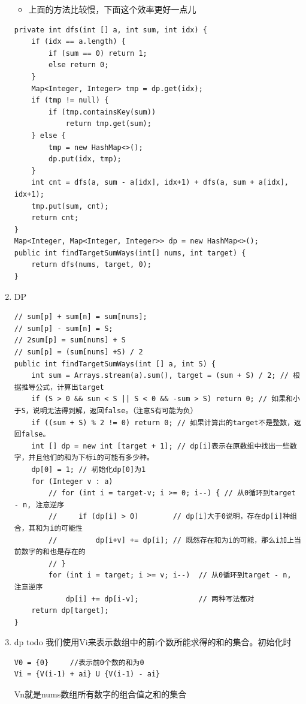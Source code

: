 \documentclass[9pt, b5paaper]{book}
\begin{document}
\begin{enumerate}
\begin{itemize}
\item 上面的方法比较慢，下面这个效率更好一点儿
\end{itemize}
\begin{verbatim}
private int dfs(int [] a, int sum, int idx) {
    if (idx == a.length) {
        if (sum == 0) return 1;
        else return 0;
    }
    Map<Integer, Integer> tmp = dp.get(idx);
    if (tmp != null) {
        if (tmp.containsKey(sum))
            return tmp.get(sum);
    } else {
        tmp = new HashMap<>();
        dp.put(idx, tmp);
    }
    int cnt = dfs(a, sum - a[idx], idx+1) + dfs(a, sum + a[idx], idx+1);
    tmp.put(sum, cnt);
    return cnt;
}
Map<Integer, Map<Integer, Integer>> dp = new HashMap<>();
public int findTargetSumWays(int[] nums, int target) {
    return dfs(nums, target, 0);
}
\end{verbatim}
\item DP
\label{sec-1-1-6-3}
\begin{verbatim}
// sum[p] + sum[n] = sum[nums];
// sum[p] - sum[n] = S;
// 2sum[p] = sum[nums] + S
// sum[p] = (sum[nums] +S) / 2
public int findTargetSumWays(int [] a, int S) {
    int sum = Arrays.stream(a).sum(), target = (sum + S) / 2; // 根据推导公式，计算出target
    if (S > 0 && sum < S || S < 0 && -sum > S) return 0; // 如果和小于S，说明无法得到解，返回false。（注意S有可能为负）
    if ((sum + S) % 2 != 0) return 0; // 如果计算出的target不是整数，返回false。
    int [] dp = new int [target + 1]; // dp[i]表示在原数组中找出一些数字，并且他们的和为下标i的可能有多少种。
    dp[0] = 1; // 初始化dp[0]为1
    for (Integer v : a) 
        // for (int i = target-v; i >= 0; i--) { // 从0循环到target - n, 注意逆序
        //     if (dp[i] > 0)        // dp[i]大于0说明，存在dp[i]种组合，其和为i的可能性
        //         dp[i+v] += dp[i]; // 既然存在和为i的可能，那么i加上当前数字的和也是存在的
        // }
        for (int i = target; i >= v; i--)  // 从0循环到target - n, 注意逆序
            dp[i] += dp[i-v];              // 两种写法都对
    return dp[target];
}
\end{verbatim}
\item dp todo
\label{sec-1-1-6-4}
我们使用Vi来表示数组中的前i个数所能求得的和的集合。初始化时
\begin{verbatim}
V0 = {0}     //表示前0个数的和为0
Vi = {V(i-1) + ai} U {V(i-1) - ai}
\end{verbatim}

Vn就是nums数组所有数字的组合值之和的集合


\end{enumerate}
\end{document}
